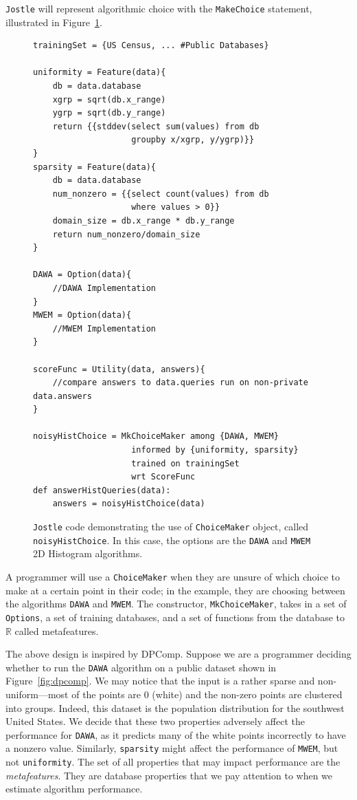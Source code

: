 \documentclass[11pt]{report}
\newcommand{\Jostle}{\texttt{Jostle}}
\renewcommand{\t}[1]{\texttt{#1}}
\begin{document}
\Jostle{} will represent algorithmic choice with the \t{MakeChoice} statement, illustrated in Figure~\ref{fig:1}.
\begin{figure}
\begin{lstlisting}[style=MyCStyle]
trainingSet = {US Census, ... #Public Databases}

uniformity = Feature(data){
    db = data.database
    xgrp = sqrt(db.x_range)
    ygrp = sqrt(db.y_range)
    return {{stddev(select sum(values) from db 
                    groupby x/xgrp, y/ygrp)}}
}
sparsity = Feature(data){
    db = data.database
    num_nonzero = {{select count(values) from db 
                    where values > 0}}
    domain_size = db.x_range * db.y_range
    return num_nonzero/domain_size
}

DAWA = Option(data){
    //DAWA Implementation
}
MWEM = Option(data){
    //MWEM Implementation
}

scoreFunc = Utility(data, answers){
    //compare answers to data.queries run on non-private data.answers
}

noisyHistChoice = MkChoiceMaker among {DAWA, MWEM}
                    informed by {uniformity, sparsity}
                    trained on trainingSet 
                    wrt ScoreFunc
def answerHistQueries(data):
    answers = noisyHistChoice(data)
\end{lstlisting}

\caption{\Jostle{} code demonstrating the use of \t{ChoiceMaker} object, called \t{noisyHistChoice}. In this case, the options are the \t{DAWA} and \t{MWEM} 2D Histogram algorithms.}
\label{fig:1}
\end{figure}
A programmer will use a \t{ChoiceMaker} when they are unsure of which choice to make at a certain point in their code; in the example, they are choosing between the algorithms \t{DAWA} and \t{MWEM}. The constructor, \t{MkChoiceMaker}, takes in a set of \t{Options}, a set of training databases, and a set of functions from the database to $\mathbb{R}$ called metafeatures.

The above design is inspired by DPComp. Suppose we are a programmer deciding whether to run the \t{DAWA} algorithm on a public dataset shown in Figure~\ref{fig:dpcomp}. We may notice that the input is a rather sparse and non-uniform---most of the points are 0 (white) and the non-zero points are clustered into groups. Indeed, this dataset is the population distribution for the southwest United States. We decide that these two properties adversely affect the performance for \t{DAWA}, as it predicts many of the white points incorrectly to have a nonzero value. Similarly, \t{sparsity} might affect the performance of \t{MWEM}, but not \t{uniformity}. The set of all properties that may impact performance are the \emph{metafeatures}. They are database properties that we pay attention to when we estimate algorithm performance.
\end{document}
